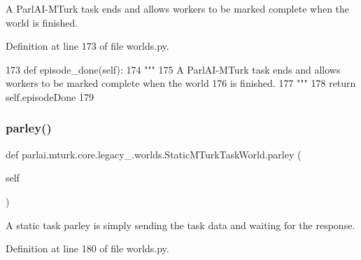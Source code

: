 \begin{DoxyVerb}A ParlAI-MTurk task ends and allows workers to be marked complete when the world
is finished.
\end{DoxyVerb}
 

Definition at line 173 of file worlds.\+py.


\begin{DoxyCode}
173     \textcolor{keyword}{def }episode\_done(self):
174         \textcolor{stringliteral}{"""}
175 \textcolor{stringliteral}{        A ParlAI-MTurk task ends and allows workers to be marked complete when the world}
176 \textcolor{stringliteral}{        is finished.}
177 \textcolor{stringliteral}{        """}
178         \textcolor{keywordflow}{return} self.episodeDone
179 
\end{DoxyCode}
\mbox{\label{classparlai_1_1mturk_1_1core_1_1legacy__2018_1_1worlds_1_1StaticMTurkTaskWorld_ac9cfc1ec78d286d1a4da6b21455b7358}} 
\subsubsection{\texorpdfstring{parley()}{parley()}}
{\footnotesize\ttfamily def parlai.\+mturk.\+core.\+legacy\+\_.\+worlds.\+Static\+M\+Turk\+Task\+World.\+parley (\begin{DoxyParamCaption}\item[{}]{self }\end{DoxyParamCaption})}

\begin{DoxyVerb}A static task parley is simply sending the task data and waiting for the
response.
\end{DoxyVerb}
 

Definition at line 180 of file worlds.\+py.


